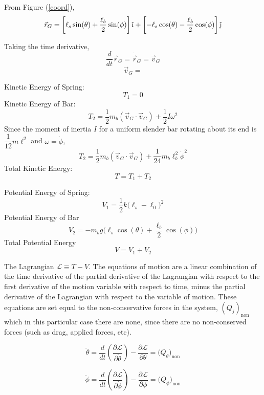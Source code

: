 \documentclass[12pt]{report}
\newcommand{\Lag}{\mathcal{L}} %
\begin{document}
\begin{flushleft}
From Figure (\ref{coord}),
$$\vec{r}_G = \left[\ell_s\sin(\theta) + \frac{\ell_b}{2}\sin(\phi)\right]\hat{\textrm{\i}}
 + \left[-\ell_s\cos(\theta) - \frac{\ell_b}{2}\cos(\phi)\right]\hat{\textrm{\j}}$$

Taking the time derivative,
$$\frac{d}{dt}\vec{r}_G = \dot{\vec{r}}_G = \vec{v}_G$$
$$\vec{v}_G =  $$


Kinetic Energy of Spring:
$$T_1 = 0$$
Kinetic Energy of Bar:
$$T_2 = \frac{1}{2}m_{b}(\vec{v}_G \cdot \vec{v}_G) + \frac{1}{2}I\omega^2$$
Since the moment of inertia $I$ for a uniform slender bar rotating about its end is
$\dfrac{1}{12}m\ell^2$ and $\omega = \dot{\phi}$,
$$T_2 = \frac{1}{2}m_{b}(\vec{v}_G \cdot \vec{v}_G) + \frac{1}{24}m_{b}\ell_b^2\dot{\phi}^2$$
Total Kinetic Energy:
$$T = T_1 + T_2$$

Potential Energy of Spring:
$$V_1 = \frac{1}{2}k\big(\ell_s-\ell_0\big)^2$$
Potential Energy of Bar
$$V_2 = - m_bg\big(\ell_s\cos(\theta) + \frac{\ell_b}{2}\cos(\phi)\big)$$
Total Potential Energy
$$V = V_1 + V_2$$

The Lagrangian $\Lag \equiv T - V$.
The equations of motion are a linear combination of the time derivative of the partial derivative of the Lagrangian with respect to the first derivative of the motion variable with
respect to time, minus the partial derivative of the Lagrangian with respect to the variable
 of motion. These equations are set equal to the non-conservative forces in the system,
 $(Q_j)_{\text{non}}$ which in this particular case there are none, since there are no
 non-conserved forces (such as drag, applied forces, etc).

$$\ddot{\theta} = \frac{d}{dt}\left(\frac{\partial\Lag}{\partial\dot{\theta}}\right) -
\frac{\partial\Lag}{\partial\theta} = \big(Q_{\theta}\big)_{\text{non}}$$

$$\ddot{\phi} = \frac{d}{dt}\left(\frac{\partial\Lag}{\partial\dot{\phi}}\right) -
\frac{\partial\Lag}{\partial\phi} = \big(Q_{\phi}\big)_{\text{non}}$$

\newpage

\end{flushleft}
\end{document}
